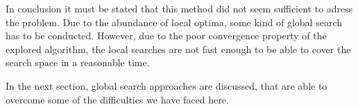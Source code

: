 In conclusion it must be stated that this method did not seem sufficient to adress the problem. Due to the abundance of local optima, some kind of global search has to be conducted. However, due to the poor convergence property of the explored algorithm, the local searches are not fast enough to be able to cover the search space in a reasonable time. 

In the next section, global search approaches are discussed, that are able to overcome some of the difficulties we have faced here.

